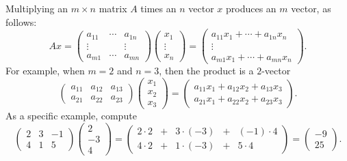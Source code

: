 Multiplying an $m\times n$ matrix $A$ times an $n$ vector $x$
produces an $m$ vector, as follows:
\begin{equation}  \label{Atimesx}
Ax=\left(
\begin{array}{ccc}
 a_{11}  & \cdots & a_{1n} \\
 \vdots  &        & \vdots  \\
 a_{m1}  & \cdots & a_{mn}
\end{array}
\right)
\left(
\begin{array}{c}
x_1 \\ \vdots \\ x_n
\end{array}
\right)
=
\left(
\begin{array}{c}
a_{11}x_1 + \cdots + a_{1n}x_n \\ \vdots \\
a_{m1}x_1 + \cdots + a_{mn}x_n
\end{array}
\right).
\end{equation}
For example, when $m=2$ and $n=3$, then the product is a $2$-vector
\begin{equation} \label{Atimesx231}
\left(
\begin{array}{ccc}
 a_{11}  & a_{12} & a_{13} \\
 a_{21}  & a_{22} & a_{23}
\end{array}
\right)
\left(
\begin{array}{c}
x_1 \\ x_2 \\ x_3
\end{array}
\right)
=
\left(
\begin{array}{c}
a_{11}x_1 + a_{12}x_2 + a_{13}x_3 \\
a_{21}x_1 + a_{22}x_2 + a_{23}x_3
\end{array}
\right).
\end{equation}
As a specific example, compute
\[
\left(
\begin{array}{rrr}
 2  & 3 & -1 \\
 4  & 1 &  5
\end{array}
\right)
\left(
\begin{array}{r}
2 \\ -3 \\ 4
\end{array}
\right)
=
\left(
\begin{array}{ccccc}
2\cdot 2 & + & 3\cdot(-3) & + & (-1)\cdot 4 \\
4\cdot 2 & + & 1\cdot(-3) & + & 5\cdot 4
\end{array}
\right)
=
\left(
\begin{array}{r}
-9 \\ 25
\end{array}
\right).
\]


